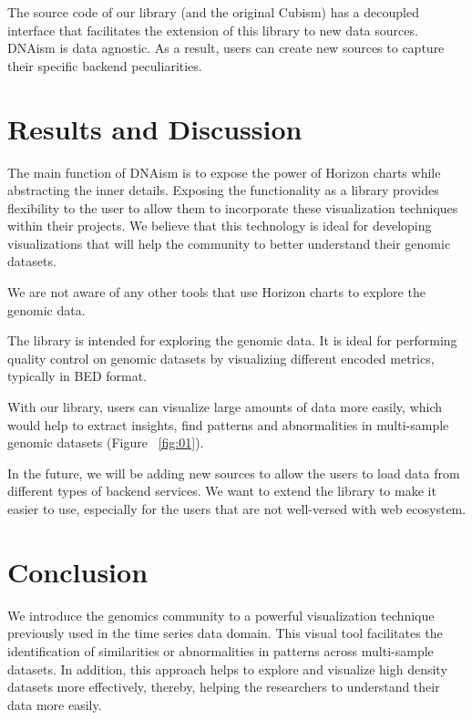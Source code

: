 \documentclass[twocolumn]{bmcart}
\begin{document}
The source code of our library (and the original Cubism) has a decoupled
interface that facilitates the extension of this library to new data sources.
DNAism is data agnostic. As a result, users can create new sources to capture
their specific backend peculiarities.


\section*{Results and Discussion}


The main function of DNAism is to expose the power of Horizon charts while
abstracting the inner details. Exposing the functionality as a library provides
flexibility to the user to allow them to incorporate these visualization
techniques within their projects. We believe that this technology is ideal for
developing visualizations that will help the community to better understand their
genomic datasets. 


We are not aware of any other tools that use Horizon charts to explore the
genomic data.


The library is intended for exploring the genomic data. It is ideal for
performing quality control on genomic datasets by visualizing different encoded
metrics, typically in BED format.

With our library, users can  visualize large amounts of data more easily, which
would help to extract insights, find patterns and abnormalities in multi-sample
genomic datasets (Figure ~\ref{fig:01}).

In the future, we will be adding new sources to allow the users to load data
from different types of backend services. We want to extend the library to make
it easier to use, especially for the users that are not well-versed with web
ecosystem. 



\section*{Conclusion}


We introduce the genomics community to a powerful visualization technique
previously used in the time series data domain. This visual tool facilitates
the identification of similarities or abnormalities in patterns across
multi-sample datasets.  In addition, this approach helps to explore and
visualize high density datasets more effectively, thereby, helping the
researchers to understand their data more easily.
\end{document}

